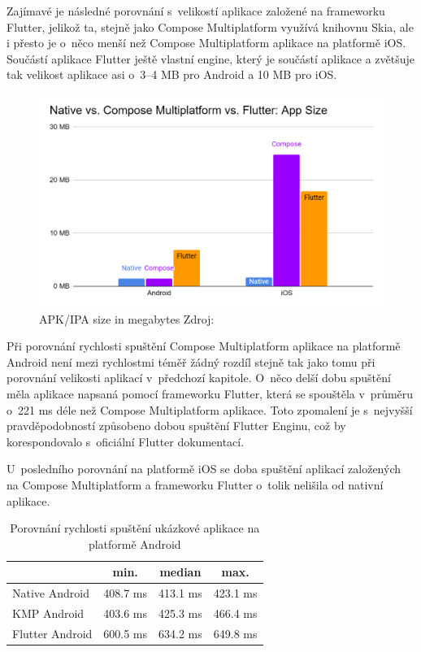 Zajímavé je následné porovnání s~velikostí aplikace založené na frameworku Flutter, jelikož ta, stejně jako Compose
Multiplatform využívá knihovnu Skia, ale i přesto je o~něco menší než Compose Multiplatform aplikace na platformě iOS.
Součástí aplikace Flutter ještě vlastní engine, který je součástí aplikace a zvětšuje tak velikost aplikace asi o~3–4 MB pro Android a 10 MB 
pro iOS. \cite{flutterSize}

\begin{figure}[H]
  \centering
  \includegraphics[width=.7\textwidth]{chart_app_sizes.png}
  \caption{APK/IPA size in megabytes Zdroj: \cite{imgAndroidFlutterCompose}}
  \label{fig:chart_app_sizes}
\end{figure}


Při porovnání rychlosti spuštění Compose Multiplatform aplikace na platformě Android není mezi rychlostmi téměř žádný
rozdíl stejně tak jako tomu při porovnání velikosti aplikací v~předchozí kapitole. O~něco delší dobu spuštění měla
aplikace napsaná pomocí frameworku Flutter, která se spouštěla v~průměru o~221 ms déle než Compose Multiplatform aplikace. 
Toto zpomalení je s~nejvyšší pravděpodobností způsobeno dobou spuštění Flutter Enginu, což by korespondovalo s~oficiální
Flutter dokumentací. \cite{flutterPerformance}

U~posledního porovnání na platformě iOS se doba spuštění aplikací založených na Compose Multiplatform a frameworku 
Flutter o~tolik nelišila od nativní aplikace.


\begin{table}[H]
  \centering
  \caption{Porovnání rychlosti spuštění ukázkové aplikace na platformě Android}
  \begin{tabular}{|l|c|c|c|}
    \hline
       & min. & median & max. \\ \hline 
      Native Android & 408.7 ms & 413.1 ms & 423.1 ms \\
      KMP Android & 403.6 ms & 425.3 ms & 466.4 ms \\
      Flutter Android & 600.5 ms & 634.2 ms & 649.8 ms \\ \hline
  \end{tabular}
  \label{tab:performance_comparison}
\end{table}


